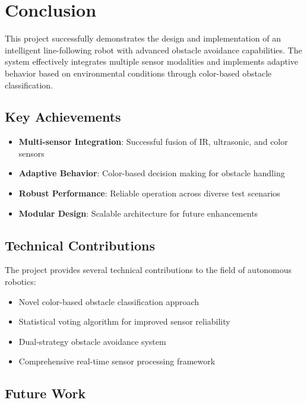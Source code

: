 \documentclass[12pt,a4paper]{article}
\begin{document}
\section{Conclusion}

This project successfully demonstrates the design and implementation of an intelligent line-following robot with advanced obstacle avoidance capabilities. The system effectively integrates multiple sensor modalities and implements adaptive behavior based on environmental conditions through color-based obstacle classification.

\subsection{Key Achievements}

\begin{itemize}
    \item \textbf{Multi-sensor Integration}: Successful fusion of IR, ultrasonic, and color sensors
    \item \textbf{Adaptive Behavior}: Color-based decision making for obstacle handling
    \item \textbf{Robust Performance}: Reliable operation across diverse test scenarios
    \item \textbf{Modular Design}: Scalable architecture for future enhancements
\end{itemize}

\subsection{Technical Contributions}

The project provides several technical contributions to the field of autonomous robotics:

\begin{itemize}
    \item Novel color-based obstacle classification approach
    \item Statistical voting algorithm for improved sensor reliability
    \item Dual-strategy obstacle avoidance system
    \item Comprehensive real-time sensor processing framework
\end{itemize}

\subsection{Future Work}
\end{document}
